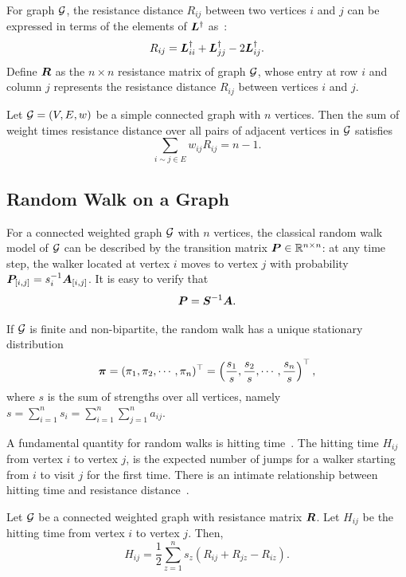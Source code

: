 \documentclass[journal]{IEEEtran}
\begin{document}
For graph \(\mathcal{G}\), the resistance distance \(R_{ij}\) between two vertices \(i\) and \(j\) can be expressed in terms of the elements of \(\boldsymbol{L}^{\dagger}\) as~\cite{KlRa93}:
\begin{equation}\label{EE04}
    R_{ij}={\boldsymbol{L}}_{ii}^{\dagger}+{\boldsymbol{L}}_{jj}^{\dagger}-2{\boldsymbol{L}}_{ij}^{\dagger}.
\end{equation}
Define \(\boldsymbol{R}\) as the \(n \times n\) resistance matrix of graph \(\mathcal{G}\), whose entry at row \(i\) and column \(j\) represents the resistance distance \(R_{ij}\) between vertices \(i\) and \(j\).

\begin{lemma}\label{Foster} \cite{Te91}
    Let \(\mathcal{G}=(V,E,w)\) be a simple connected graph with \(n\) vertices. Then the sum of  weight times resistance distance over all pairs of adjacent vertices in  \(\mathcal{G}\)  satisfies
    \begin{equation*}
        \sum_{ i\sim j\in E }w_{ij}R_{ij}=n-1.
    \end{equation*}
\end{lemma}

\subsection{Random Walk on a Graph}

For a connected weighted graph \(\mathcal{G}\) with \(n\) vertices, the classical random walk model of \(\mathcal{G}\) can be described by the transition matrix \(\boldsymbol{P}\in\mathbb{R}^{n\times n}\): at any time step, the walker located at vertex \(i\) moves to vertex \(j\) with probability \({\boldsymbol{P}_{[i,j]}=s_i^{-1}\boldsymbol{A}_{[i,j]}}\).
It is easy to verify that
\begin{equation}\label{eq:trs}
    \boldsymbol{P}=\boldsymbol{S}^{-1}\boldsymbol{A}.
\end{equation}

If  \(\mathcal{G}\) is  finite and non-bipartite, the random walk  has a unique stationary distribution~\cite{LiZh13PRE}
\begin{equation}\label{EE01}
    \boldsymbol{\pi}=(\pi_1, \pi_2, \cdots, \pi_n)^{\top}=\left(\frac{s_1}{s}, \frac{s_2}{s}, \cdots, \frac{s_n}{s}\right)^{\top},
\end{equation}
where \(s\) is the sum of strengths over all vertices, namely \(s=\sum_{i=1}^n s_i=\sum_{i=1}^{n}\sum_{j=1}^{n} a_{ij}\).

A fundamental quantity for random walks is hitting time~\cite{Lo93,CoBeTeVoKl07}. The hitting time \(H_{ij}\) from vertex \(i\) to vertex \(j\),  is the expected number of jumps for a walker starting  from \(i\) to visit \(j\) for the first time. There is an intimate relationship between hitting time and resistance distance~\cite{Te91}.
\begin{lemma}
    Let \(\mathcal{G}\) be a connected weighted graph with  resistance matrix  \(\boldsymbol{R}\). Let \(H_{ij}\) be the hitting time  from vertex \(i\) to vertex \(j\). Then,
    \begin{equation}\label{EE03}
        H_{ij}=\frac{1}{2}\sum_{z=1}^{n} s_z(R_{ij}+R_{jz}-R_{iz}).
    \end{equation}
\end{lemma}
\end{document}
